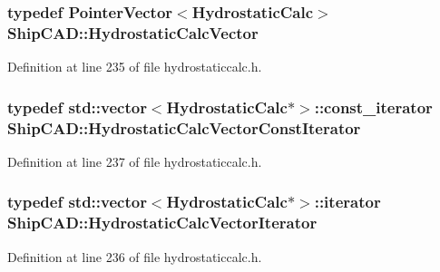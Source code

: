 \subsubsection[{\texorpdfstring{Hydrostatic\+Calc\+Vector}{HydrostaticCalcVector}}]{\setlength{\rightskip}{0pt plus 5cm}typedef {\bf Pointer\+Vector}$<${\bf Hydrostatic\+Calc}$>$ {\bf Ship\+C\+A\+D\+::\+Hydrostatic\+Calc\+Vector}}\hypertarget{namespaceShipCAD_a0c7b012d8868cbb43871cf0bf303ccc6}{}\label{namespaceShipCAD_a0c7b012d8868cbb43871cf0bf303ccc6}


Definition at line 235 of file hydrostaticcalc.\+h.

\subsubsection[{\texorpdfstring{Hydrostatic\+Calc\+Vector\+Const\+Iterator}{HydrostaticCalcVectorConstIterator}}]{\setlength{\rightskip}{0pt plus 5cm}typedef std\+::vector$<${\bf Hydrostatic\+Calc}$\ast$$>$\+::const\+\_\+iterator {\bf Ship\+C\+A\+D\+::\+Hydrostatic\+Calc\+Vector\+Const\+Iterator}}\hypertarget{namespaceShipCAD_afd3fb43e1160083a9aee5f5d076abf43}{}\label{namespaceShipCAD_afd3fb43e1160083a9aee5f5d076abf43}


Definition at line 237 of file hydrostaticcalc.\+h.

\subsubsection[{\texorpdfstring{Hydrostatic\+Calc\+Vector\+Iterator}{HydrostaticCalcVectorIterator}}]{\setlength{\rightskip}{0pt plus 5cm}typedef std\+::vector$<${\bf Hydrostatic\+Calc}$\ast$$>$\+::iterator {\bf Ship\+C\+A\+D\+::\+Hydrostatic\+Calc\+Vector\+Iterator}}\hypertarget{namespaceShipCAD_a09b1b198129010214012a1cc49c98e28}{}\label{namespaceShipCAD_a09b1b198129010214012a1cc49c98e28}


Definition at line 236 of file hydrostaticcalc.\+h.

